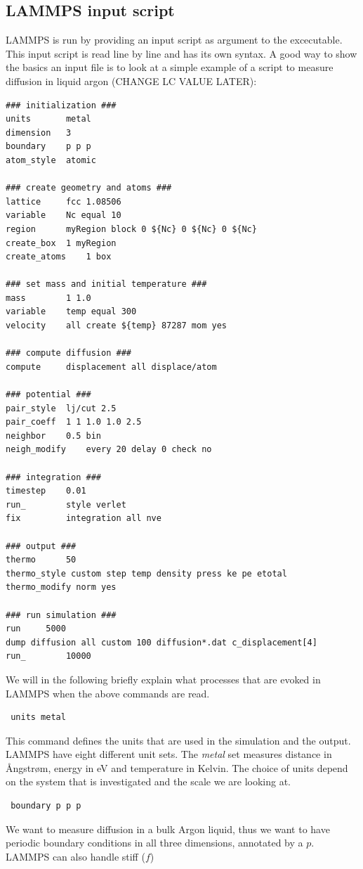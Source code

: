\documentclass[twoside,english]{uiofysmaster}
\begin{document}
\subsection{LAMMPS input script}
LAMMPS is run by providing an input script as 
argument to the excecutable. This input script
is read line by line and has its own syntax. 
A good way to show the basics an input file
is to look at a simple example of a script
to measure diffusion in liquid argon 
(CHANGE LC VALUE LATER):
\begin{lstlisting}
### initialization ###
units 		metal		
dimension 	3
boundary	p p p		
atom_style	atomic		

### create geometry and atoms ###
lattice 	fcc 1.08506
variable	Nc equal 10
region 		myRegion block 0 ${Nc} 0 ${Nc} 0 ${Nc}
create_box	1 myRegion
create_atoms	1 box

### set mass and initial temperature ###
mass		1 1.0
variable	temp equal 300
velocity	all create ${temp} 87287 mom yes 

### compute diffusion ###
compute 	displacement all displace/atom

### potential ###
pair_style	lj/cut 2.5
pair_coeff	1 1 1.0 1.0 2.5
neighbor	0.5 bin
neigh_modify	every 20 delay 0 check no

### integration ###
timestep 	0.01
run_		style verlet
fix 		integration all nve

### output ###
thermo		50
thermo_style custom step temp density press ke pe etotal 
thermo_modify norm yes

### run simulation ###
run		5000
dump diffusion all custom 100 diffusion*.dat c_displacement[4]
run_		10000
\end{lstlisting}
We will in the following briefly explain what
processes that are evoked in LAMMPS when the 
above commands are read. 
\begin{lstlisting}
 units metal
\end{lstlisting}
This command defines the units that are used 
in the simulation and the output. LAMMPS have eight
different unit sets. The \textit{metal} set measures
distance in Ångstrøm, energy in eV and temperature
in Kelvin. The choice of units depend on the system
that is investigated and the scale we are looking at.
\begin{lstlisting}
 boundary p p p
\end{lstlisting}
We want to measure diffusion in a bulk
Argon liquid, thus we want to have periodic 
boundary conditions in all three dimensions, 
annotated by a $p$. LAMMPS can also handle stiff ($f$)
\end{document}
